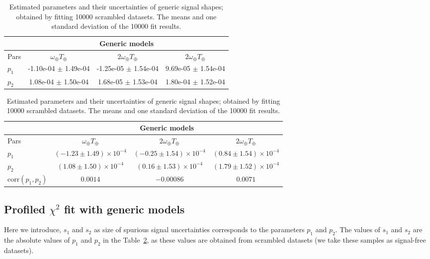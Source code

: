 \begin{table}[hp]
\begin{center}
\color{gray}
\begin{tabular}{|l|c| c| c|}
\hline
  & \multicolumn{3}{|c|}{Generic models}\\
\hline
 Pars & $\omega_\oplus T_\oplus$ & $2\omega_\oplus T_\oplus$ & $2\omega_\oplus T_\oplus$\\
 \hline
$p_{1}$ & -1.10e-04 $\pm$ 1.49e-04 & -1.25e-05 $\pm$  1.54e-04 & 9.69e-05 $\pm$  1.54e-04\\
\hline
$p_{2}$ & 1.08e-04 $\pm$ 1.50e-04 & 1.68e-05 $\pm$ 1.53e-04 & 1.80e-04 $\pm$ 1.52e-04\\
\hline
\hline
\end{tabular}
\color{black}

\begin{tabular}{|l|c| c| c|}
  \hline
    & \multicolumn{3}{|c|}{Generic models}\\
  \hline
   Pars & $\omega_\oplus T_\oplus$ & $2\omega_\oplus T_\oplus$ & $2\omega_\oplus T_\oplus$\\
   \hline
  $p_1$ & $(-1.23 \pm 1.49)\times 10^{-4}$ & $(-0.25 \pm 1.54)\times 10^{-4}$ & $(0.84 \pm 1.54)\times 10^{-4}$ \\
  \hline
  $p_2$ & $(1.08 \pm 1.50)\times 10^{-4}$ & $(0.16 \pm 1.53)\times 10^{-4}$ & $(1.79 \pm 1.52)\times 10^{-4}$ \\
  \hline
  $\text{corr}(p_1,p_2)$ & $0.0014$ & $-0.00086$ & $0.0071$ \\
  \hline
  \hline
  \end{tabular}
\end{center}
\caption{Estimated parameters and their 
uncertainties of generic signal shapes; 
obtained by fitting 10000 scrambled datasets. 
The means and one standard deviation of the 10000 fit results.}
\label{table:real_data_scrambled_Generic_combined_fit}
\end{table}
%

\subsection{Profiled $\chi^{2}$ fit with generic models}
Here we introduce, $s_{1}$ and $s_{2}$ 
as size of spurious signal uncertainties
corresponds to the parameters 
$p_{1}$ and $p_{2}$. The values of $s_{1}$ and 
$s_{2}$ are the absolute values of 
$p_{1}$ and $p_{2}$ in the 
Table~\ref{table:real_data_scrambled_Generic_combined_fit}, 
as these values are obtained from scrambled 
datasets (we take these samples as signal-free datasets). 

